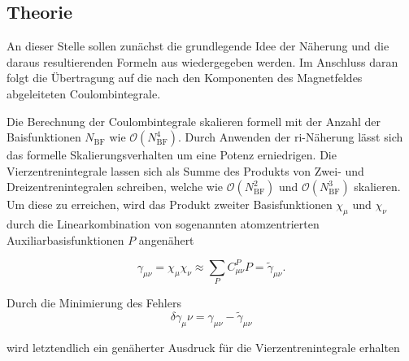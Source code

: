 	\subsection{Theorie}
	An dieser Stelle sollen zunächst die grundlegende Idee der Näherung und die daraus resultierenden Formeln aus \supercite{vahtras1993integral} wiedergegeben werden. Im Anschluss daran folgt die Übertragung auf die nach den Komponenten des Magnetfeldes abgeleiteten Coulombintegrale. 
	
	Die Berechnung der Coulombintegrale skalieren formell mit der Anzahl der Baisfunktionen $N_\textrm{BF}$ wie $\mathcal{O}(N_\textrm{BF}^4)$. Durch Anwenden der \ac{ri}-Näherung lässt sich das formelle Skalierungsverhalten um eine Potenz erniedrigen. Die Vierzentrenintegrale lassen sich als Summe des Produkts von Zwei- und Dreizentrenintegralen schreiben, welche wie $\mathcal{O}(N_\textrm{BF}^2)$ und $\mathcal{O}(N_\textrm{BF}^3)$ skalieren. Um diese zu erreichen, wird das Produkt zweiter Basisfunktionen $\chi_\mu$ und $\chi_\nu$ durch die Linearkombination von sogenannten atomzentrierten Auxiliarbasisfunktionen $P$ angenähert
	
	\begin{equation}
	\gamma_{\mu\nu}=\chi_\mu\chi_\nu\approx\sum_PC^P_{\mu\nu}P=\tilde{\gamma}_{\mu\nu}.
	\end{equation}
	
	Durch die Minimierung des Fehlers
	\begin{equation}
	\delta\gamma_{\mu}\nu = \gamma_{\mu\nu}-\tilde{\gamma}_{\mu\nu}
	\end{equation}
	
	wird letztendlich ein genäherter Ausdruck für die Vierzentrenintegrale erhalten
	

